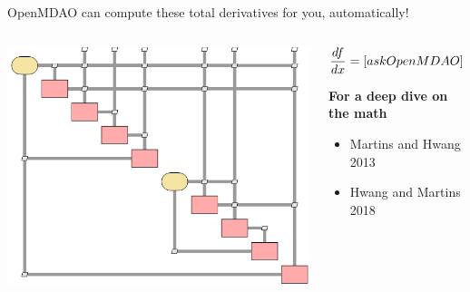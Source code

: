 \documentclass[aspectratio=169, usenames,dvipsnames, 14pt]{beamer}
\begin{document}
\begin{frame}{OpenMDAO can compute these total derivatives for you, automatically!}
\begin{columns}
        \includegraphics[scale=0.5]{images/slide_81.png}
    
        \begin{center}

        \begin{equation*}
            \LARGE\frac{df}{dx} = [ask OpenMDAO]
        \end{equation*}
       
    \textbf{For a deep dive on the math}
            \begin{itemize}
                \item Martins and Hwang 2013
                \item Hwang and Martins 2018 
            \end{itemize}
        \end{center}
\end{columns}
    
\end{frame}

\end{document}
